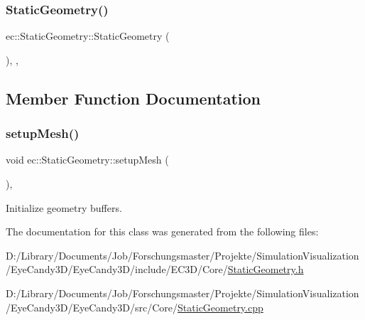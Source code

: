 \subsubsection{\texorpdfstring{Static\+Geometry()}{StaticGeometry()}}
{\footnotesize\ttfamily ec\+::\+Static\+Geometry\+::\+Static\+Geometry (\begin{DoxyParamCaption}{ }\end{DoxyParamCaption})\hspace{0.3cm}{\ttfamily [explicit]}, {\ttfamily [protected]}, {\ttfamily [default]}}



\subsection{Member Function Documentation}
\mbox{\label{classec_1_1_static_geometry_a971d3c59c50d0ae540b95ecb77d5a05a}} 
\subsubsection{\texorpdfstring{setup\+Mesh()}{setupMesh()}}
{\footnotesize\ttfamily void ec\+::\+Static\+Geometry\+::setup\+Mesh (\begin{DoxyParamCaption}{ }\end{DoxyParamCaption})\hspace{0.3cm}{\ttfamily [protected]}, {\ttfamily [virtual]}}



Initialize geometry buffers. 



The documentation for this class was generated from the following files\+:\begin{DoxyCompactItemize}
\item 
D\+:/\+Library/\+Documents/\+Job/\+Forschungsmaster/\+Projekte/\+Simulation\+Visualization/\+Eye\+Candy3\+D/\+Eye\+Candy3\+D/include/\+E\+C3\+D/\+Core/\mbox{\hyperlink{_static_geometry_8h}{Static\+Geometry.\+h}}\item 
D\+:/\+Library/\+Documents/\+Job/\+Forschungsmaster/\+Projekte/\+Simulation\+Visualization/\+Eye\+Candy3\+D/\+Eye\+Candy3\+D/src/\+Core/\mbox{\hyperlink{_static_geometry_8cpp}{Static\+Geometry.\+cpp}}\end{DoxyCompactItemize}
